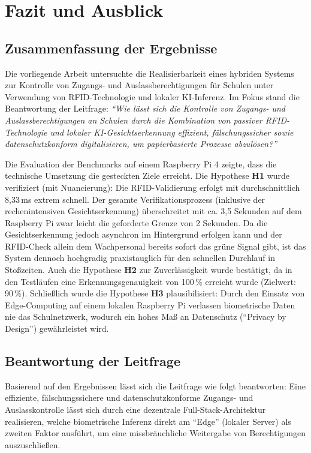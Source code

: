 \section{Fazit und Ausblick} \label{sec:fazit}

\subsection{Zusammenfassung der Ergebnisse} \label{subsec:zusammenfassung}

Die vorliegende Arbeit untersuchte die Realisierbarkeit eines hybriden Systems zur Kontrolle von Zugangs- und Auslassberechtigungen für Schulen unter Verwendung von RFID-Technologie und lokaler KI-Inferenz. Im Fokus stand die Beantwortung der Leitfrage: \textit{\enquote{Wie lässt sich die Kontrolle von Zugangs- und Auslassberechtigungen an Schulen durch die Kombination von passiver RFID-Technologie und lokaler KI-Gesichtserkennung effizient, fälschungssicher sowie datenschutzkonform digitalisieren, um papierbasierte Prozesse abzulösen?}}

Die Evaluation der Benchmarks auf einem Raspberry Pi 4 zeigte, dass die technische Umsetzung die gesteckten Ziele erreicht. Die Hypothese \textbf{H1} wurde verifiziert (mit Nuancierung): Die RFID-Validierung erfolgt mit durchschnittlich 8,33\,ms extrem schnell. Der gesamte Verifikationsprozess (inklusive der rechenintensiven Gesichtserkennung) überschreitet mit ca. 3,5 Sekunden auf dem Raspberry Pi zwar leicht die geforderte Grenze von 2 Sekunden. Da die Gesichtserkennung jedoch asynchron im Hintergrund erfolgen kann und der RFID-Check allein dem Wachpersonal bereits sofort das grüne Signal gibt, ist das System dennoch hochgradig praxistauglich für den schnellen Durchlauf in Stoßzeiten. Auch die Hypothese \textbf{H2} zur Zuverlässigkeit wurde bestätigt, da in den Testläufen eine Erkennungsgenauigkeit von 100\,\% erreicht wurde (Zielwert: 90\,\%). Schließlich wurde die Hypothese \textbf{H3} plausibilisiert: Durch den Einsatz von Edge-Computing auf einem lokalen Raspberry Pi verlassen biometrische Daten nie das Schulnetzwerk, wodurch ein hohes Maß an Datenschutz (\enquote{Privacy by Design}) gewährleistet wird.

\subsection{Beantwortung der Leitfrage} \label{subsec:beantwortung_leitfrage}

Basierend auf den Ergebnissen lässt sich die Leitfrage wie folgt beantworten: Eine effiziente, fälschungssichere und datenschutzkonforme Zugangs- und Auslasskontrolle lässt sich durch eine dezentrale Full-Stack-Architektur realisieren, welche biometrische Inferenz direkt am \enquote{Edge} (lokaler Server) als zweiten Faktor ausführt, um eine missbräuchliche Weitergabe von Berechtigungen auszuschließen.

